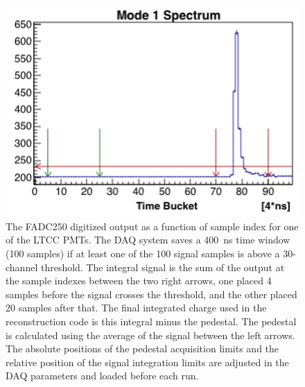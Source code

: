 \begin{figure}[H]
	\centering
	\includegraphics[width=0.99\columnwidth, height=0.6\columnwidth]{img/fadc.png}
	\caption{The FADC250 digitized output as a function of sample index for one of the LTCC PMTs.
          The DAQ system saves a 400~ns time window (100 samples) if at least one of the 100 signal samples is
          above a 30-channel threshold. The integral signal is the sum of the output at the sample indexes between
          the two right arrows, one placed 4 samples before the signal crosses the threshold, and the other placed
          20 samples after that. The final integrated charge used in the reconstruction code is this integral minus
          the pedestal. The pedestal is calculated using the average of the signal between the left arrows. The
          absolute positions of the pedestal acquisition limits and the relative position of the signal integration
          limits are adjusted in the DAQ parameters and loaded before each run.}
	\label{fig:fadc}
\end{figure}


